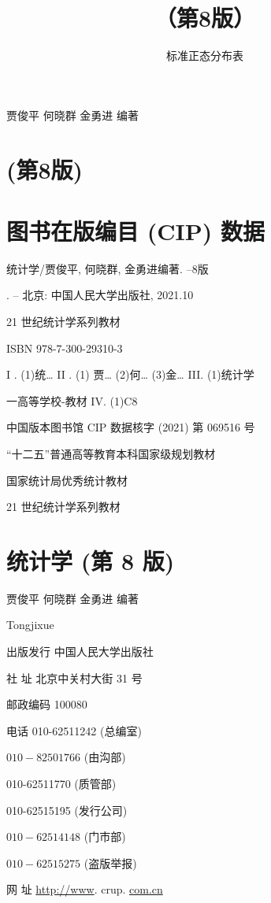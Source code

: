 \documentclass[10pt]{article}
\title{（第8版） }
\author{标准正态分布表}
\date{}
\begin{document}
\begin{CJK*}{UTF8}{bsmi}
\maketitle
\begin{center}
\end{center}

贾俊平 何晓群 金勇进 编著

\section*{(第8版) }


\section*{图书在版编目 (CIP) 数据}
统计学/贾俊平, 何晓群, 金勇进编著. --8版

. -- 北京: 中国人民大学出版社, 2021.10

21 世纪统计学系列教材

ISBN 978-7-300-29310-3

I . (1)统… II . (1) 贾… (2)何… (3)金… III. (1)统计学

一高等学校-教材 IV. (1)C8

中国版本图书馆 CIP 数据核字 (2021) 第 069516 号

“十二五”普通高等教育本科国家级规划教材

国家统计局优秀统计教材

21 世纪统计学系列教材

\section*{统计学 (第 8 版)}
贾俊平 何晓群 金勇进 编著

Tongjixue

出版发行 中国人民大学出版社

社 址 北京中关村大街 31 号

邮政编码 100080

电话 010-62511242 (总编室)

$010-82501766$ (由沟部)

010-62511770 (质管部)

010-62515195 (发行公司)

$010-62514148$ (门市部)

$010-62515275$ (盗版举报)

网 址 \href{http://www}{http://www}. crup. \href{http://com.cn}{com.cn}


\end{CJK*}
\end{document}

